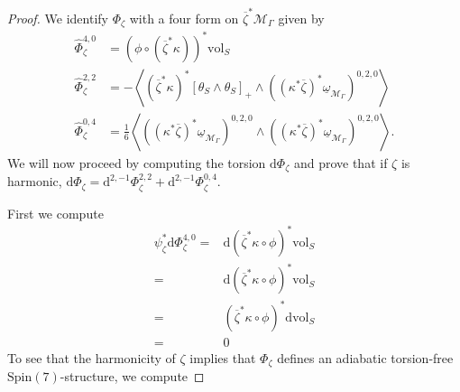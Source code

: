 \documentclass[10pt,a4paper]{amsart}
\newcommand{\m}[1]{{\mathrm{#1}}}
\begin{document}
\begin{proof}
We identify $\Phi_\zeta$ with a four form on $\overline{\zeta}^*\mathcal{M}_\Gamma$ given by 
\begin{align*}
    \hat{\Phi}_\zeta^{4,0}&=(\phi\circ(\overline{\zeta}^*\kappa))^*\m{vol}_S\\
    \hat{\Phi}_\zeta^{2,2}&=-\left<(\overline{\zeta}^*\kappa)^*\left[\theta_{S}\wedge\theta_S\right]_+\wedge((\kappa^*\overline{\zeta})^*\underline{\omega}_{\mathcal{M}_\Gamma})^{0,2,0}\right>\\
    \hat{\Phi}_\zeta^{0,4}&=\frac{1}{6}\left<((\kappa^*\overline{\zeta})^*\underline{\omega}_{\mathcal{M}_\Gamma})^{0,2,0}\wedge((\kappa^*\overline{\zeta})^*\underline{\omega}_{\mathcal{M}_\Gamma})^{0,2,0}\right>.
\end{align*}
We will now proceed by computing the torsion $\m{d}\Phi_\zeta$ and prove that if $\zeta$ is harmonic, $\m{d}\Phi_\zeta=\m{d}^{2,-1}\Phi^{2,2}_\zeta+\m{d}^{2,-1}\Phi^{0,4}_\zeta$.

First we compute
\begin{align*}
    \psi_\zeta^*\m{d}\Phi_\zeta^{4,0}=&\m{d}(\overline{\zeta}^*\kappa\circ\phi)^*\m{vol}_S\\
    =&\m{d}(\overline{\zeta}^*\kappa\circ\phi)^*\m{vol}_S\\
    =&(\overline{\zeta}^*\kappa\circ\phi)^*\m{d}\m{vol}_S\\
    =&0
\end{align*}
To see that the harmonicity of $\zeta$ implies that $\Phi_\zeta$ defines an adiabatic torsion-free $\m{Spin}(7)$-structure, we compute


\end{proof}
\end{document}
